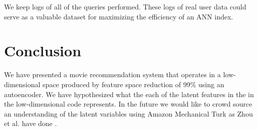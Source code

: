 \documentclass[conference]{IEEEtran}
\begin{document}
We keep logs of all of the queries performed.  These logs of real user data could serve as a valuable dataset for maximizing the efficiency of an ANN index.

\section{Conclusion} We have presented a movie recommendation system that
operates in a low-dimensional space produced by feature space reduction of
99\% using an autoencoder. We have hypothesized what the each of the latent
features in the in the low-dimensional code represents. In the future we would
like to crowd source an understanding of the latent variables using Amazon Mechanical Turk as Zhou et al. have done \cite{zhou2014object}.


\raggedright


\end{document}
